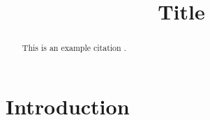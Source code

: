 \documentclass[acmsmall]{acmart}
\title{Title}
\begin{document}
\begin{abstract}

  This is an example citation \cite{kamp2022}.

\end{abstract}

\maketitle

\section{Introduction}



\end{document}
